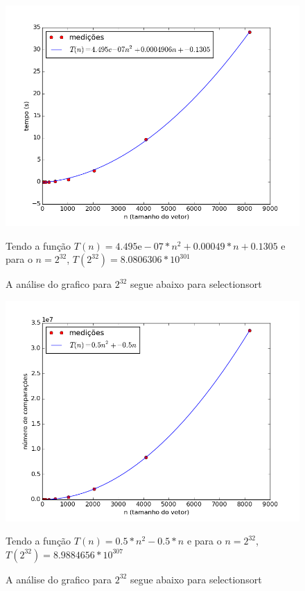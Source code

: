 \documentclass[12pt,a4paper,twoside]{report}
\begin{document}


\begin{figure}[ht]
\centering \includegraphics[scale=0.8]{../selectionsort/imagens/selectionsortDecrescente0.png}
\caption{A análise do grafico para $2^{32}$ segue abaixo para selectionsort}

Tendo a função $T(n) = 4.495\mathrm{e}-07*n^{2}+0.00049*n+0.1305$ e para o $n =2^{32}$, $T(2^{32}) = 8.0806306 * 10^{301}$
\label{fig:selectionsortDecrescente0}
\end{figure}

\begin{figure}[ht]
\centering \includegraphics[scale=0.8]{../selectionsort/imagens/selectionsortDecrescente1.png}
\caption{A análise do grafico para $2^{32}$ segue abaixo para selectionsort}

Tendo a função $T(n) = 0.5*n^{2}-0.5*n$ e para o $n =2^{32}$, $T(2^{32}) =8.9884656 * 10^{307}$
\label{fig:selectionsortDecrescente1}
\end{figure}
\end{document}
